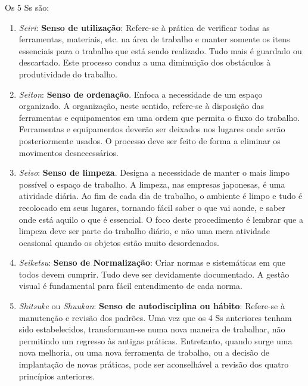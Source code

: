 \documentclass{article}
\begin{document}
Os 5 Ss são:

\begin{enumerate}
	\item \textit{Seiri}: \textbf{Senso de utilização}: Refere-se à prática de
	verificar todas as ferramentas, materiais, etc. na área de trabalho e manter
	somente os itens essenciais para o trabalho que está sendo realizado. Tudo
	mais é guardado ou descartado. Este processo conduz a uma diminuição dos
	obstáculos à produtividade do trabalho.
	
	\item \textit{Seiton}: \textbf{Senso de ordenação}. Enfoca a necessidade de
	um espaço organizado. A organização, neste sentido, refere-se à disposição
	das ferramentas e equipamentos em uma ordem que permita o fluxo do trabalho.
	Ferramentas e equipamentos deverão ser deixados nos lugares onde serão
	posteriormente usados. O processo deve ser feito de forma a eliminar os
	movimentos desnecessários.
	
	\item \textit{Seiso}: \textbf{Senso de limpeza}. Designa a necessidade de
	manter o mais limpo possível o espaço de trabalho. A limpeza, nas empresas
	japonesas, é uma atividade diária. Ao fim de cada dia de trabalho, o
	ambiente é limpo e tudo é recolocado em seus lugares, tornando fácil saber
	o que vai aonde, e saber onde está aquilo o que é essencial. O foco deste
	procedimento é lembrar que a limpeza deve ser parte do trabalho diário, e
	não uma mera atividade ocasional quando os objetos estão muito desordenados.
	
	\item \textit{Seiketsu}: \textbf{Senso de Normalização}: Criar normas e
	sistemáticas em que todos devem cumprir. Tudo deve ser devidamente
	documentado. A gestão visual é fundamental para fácil entendimento de cada
	norma.
	
	\item \textit{Shitsuke} ou \textit{Shuukan}: \textbf{Senso de autodisciplina ou hábito}:
	Refere-se à manutenção e revisão dos padrões. Uma vez que os 4 Ss anteriores
	tenham sido estabelecidos, transformam-se numa nova maneira de trabalhar,
	não permitindo um regresso às antigas práticas. Entretanto, quando surge uma
	nova melhoria, ou uma nova ferramenta de trabalho, ou a decisão de implantação
	de novas práticas, pode ser aconselhável a revisão dos quatro princípios
	anteriores.
\end{enumerate}
\end{document}
